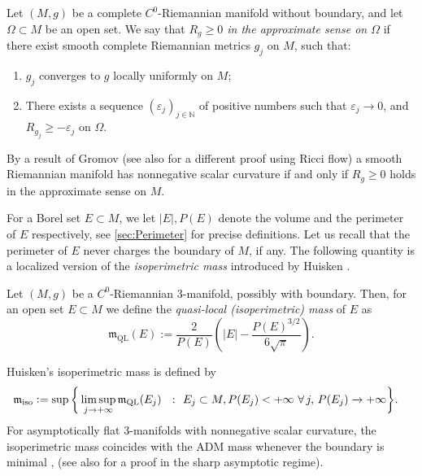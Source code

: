 \documentclass[a4paper,12pt,reqno]{amsart}
\numberwithin{equation}{section}
\theoremstyle{plain}
\theoremstyle{definition}
\theoremstyle{remark}
\newcommand{\st}{\ensuremath{\ :\ }} %
\newcommand{\eqdef}{\ensuremath{\vcentcolon=}}
\begin{document}
\begin{definition}\label{def:NonnegativeScalInApproximate}
    Let $(M,g)$ be a complete $C^0$-Riemannian manifold without boundary, and let $\Omega\subset M$ be an open set. We say that \textit{$R_{g}\geq 0$ in the approximate sense on $\Omega$} if there exist
    smooth complete Riemannian metrics $g_j$ on $M$, such that: 
    \begin{enumerate}
        \item $g_j$ converges to $g$ locally uniformly on $M$;
        \item There exists a sequence $(\varepsilon_j)_{j\in\mathbb N}$ of positive numbers such that $\varepsilon_j\to 0$, and $R_{g_j}\geq -\varepsilon_j$ on $\Omega$.
    \end{enumerate}
\end{definition}
By a result of Gromov \cite{GromovScal} (see also \cite{BamlerGromov} for a different proof using Ricci flow) a smooth Riemannian manifold has nonnegative scalar curvature if and only if $R_g\geq 0$ holds in the approximate sense on $M$.

For a Borel set $E\subset M$, we let $|E|,P(E)$ denote the volume and the perimeter of $E$ respectively, see \cref{sec:Perimeter} for precise definitions. Let us recall that the perimeter of $E$ never charges the boundary of $M$, if any. The following quantity is a localized version of the \emph{isoperimetric mass} introduced by Huisken \cite{Huisken}. 

\begin{definition}\label{def:IsopMass}
    Let $(M, g)$ be a $C^0$-Riemannian $3$-manifold, possibly with
boundary. Then, for an open set $E\subset M$ we
define the \textit{quasi-local (isoperimetric) mass} of $E$ as
\begin{equation}\label{eqn:mQL}
\mathfrak{m}_{\mathrm{QL}}(E):=\frac{2}{P(E)}\left(|E|-\frac{P(E)^{3/2}}{6\sqrt \pi}\right).
\end{equation}
\end{definition}
Huisken's isoperimetric mass is defined by
\begin{equation}
\label{eq:isomass}
\begin{split}
\mathfrak{m}_{\mathrm{iso}}\eqdef \sup
\bigg\{
\limsup_{j\to+\infty} \mathfrak{m}_{\mathrm{QL}}(E_j)
\,\,\st\,\, 
&E_j\subset M, P(E_j)<+\infty \,\,\forall\, j,\, P(E_j)\xrightarrow[]{}+\infty
\bigg\}.    
\end{split}
\end{equation}
For asymptotically flat $3$-manifolds with nonnegative scalar curvature, the isoperimetric mass coincides with the ADM mass {whenever the boundary is minimal} \cite[Theorem 3]{JaureguiLee}, \cite[Theorem C.2]{ChodoshEichmairShiYu21} (see also \cite[Theorem 1.4]{BFMIsoperimetricRiemannianPenrose} for a proof in the sharp asymptotic regime).  
\end{document}
